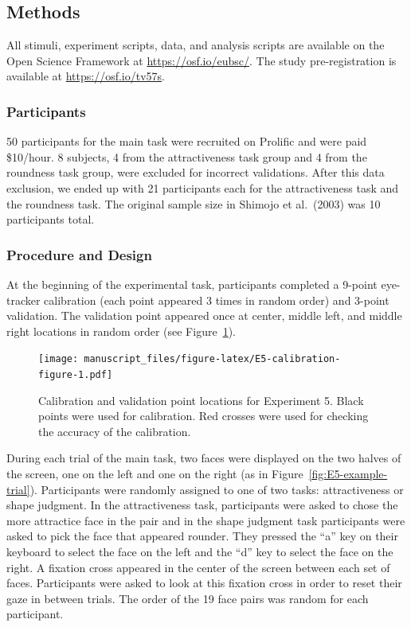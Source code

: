 \documentclass[
  man,floatsintext]{apa6}
\begin{document}
\hypertarget{methods-4}{%
\subsection{Methods}\label{methods-4}}

All stimuli, experiment scripts, data, and analysis scripts are
available on the Open Science Framework at \url{https://osf.io/eubsc/}.
The study pre-registration is available at
\url{https://osf.io/tv57s}.

\hypertarget{participants-5}{%
\subsubsection{Participants}\label{participants-5}}

50 participants for the main task were recruited on Prolific and were
paid \$10/hour. 8 subjects, 4 from the attractiveness task group and 4 from
the roundness task group, were excluded for incorrect validations.
After this
data exclusion, we ended up with 21 participants each for the
attractiveness task and the roundness task. The original sample size in
Shimojo et al.~(2003) was 10 participants total.

\hypertarget{procedure-and-design}{%
\subsubsection{Procedure and Design}\label{procedure-and-design}}

At the beginning of the experimental task, participants completed a
9-point eye-tracker calibration (each point appeared 3 times in random
order) and 3-point validation. The validation point appeared once at
center, middle left, and middle right locations in random order (see Figure~\ref{fig:E5-calibration-figure}).

\begin{figure}
\centering
\texttt{[image: manuscript\_files/figure-latex/E5-calibration-figure-1.pdf]}
\caption{\label{fig:E5-calibration-figure}Calibration and validation point locations for Experiment 5. Black points were used for calibration. Red crosses were used for checking the accuracy of the calibration.}
\end{figure}

During each trial of the main task, two faces were displayed on the two
halves of the screen, one on the left and one on the right (as in Figure~\ref{fig:E5-example-trial}). Participants were randomly assigned to one of two tasks:
attractiveness or shape judgment. In the attractiveness task,
participants were asked to chose the more attractice face in the pair
and in the shape judgment task participants were asked to pick the face
that appeared rounder. They pressed the ``a'' key on their keyboard to
select the face on the left and the ``d'' key to select the face on the
right. A fixation cross appeared in the center of the screen between
each set of faces. Participants were asked to look at this fixation
cross in order to reset their gaze in between trials. The order of
the 19 face pairs was random for each participant.
\end{document}
